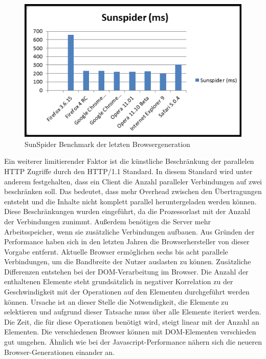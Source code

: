 \begin{figure}[!ht]
  \centering
  \includegraphics[width=1.1\textwidth]{material/sunspiderbenchmark.png}
  \caption{SunSpider Benchmark der letzten Browsergeneration}
  \label{fig:sunspider}
\end{figure}
Ein weiterer limitierender Faktor ist die künstliche Beschränkung der parallelen HTTP Zugriffe durch den HTTP/1.1 Standard. In diesem Standard wird unter anderem festgehalten, dass ein Client die Anzahl paralleler Verbindungen auf zwei beschränken soll. \citep{Fielding1999}
Das bedeutet, dass mehr Overhead zwischen den Übertragungen entsteht und die Inhalte nicht komplett parallel heruntergeladen werden k\"onnen. Diese Beschränkungen wurden eingeführt, da die Prozessorlast mit der Anzahl der Verbindungen zunimmt. Außerdem benötigen die Server mehr Arbeitsspeicher, wenn sie zusätzliche Verbindungen aufbauen. Aus Gr\"unden der Performance haben sich in den letzten Jahren die Browserhersteller von dieser Vorgabe entfernt. Aktuelle Browser ermöglichen sechs bis acht parallele Verbindungen, um die Bandbreite der Nutzer auslasten zu können. 
Zus\"atzliche Differenzen entstehen bei der DOM-Verarbeitung im Browser. Die Anzahl der enthaltenen Elemente steht grunds\"atzlich in negativer Korrelation zu der Geschwindigkeit mit der Operationen auf den Elementen durchgef\"uhrt werden k\"onnen. Ursache ist an dieser Stelle die Notwendigkeit, die Elemente zu selektieren und aufgrund dieser Tatsache muss \"uber alle Elemente iteriert werden. Die Zeit, die f\"ur diese Operationen ben\"otigt wird, steigt linear mit der Anzahl an Elementen.\citep{YahooDevNetwork2011}
Die verschiedenen Browser k\"onnen mit DOM-Elementen verschieden gut umgehen. \"Ahnlich wie bei der Javascript-Performance n\"ahern sich die neueren Browser-Generationen einander an.

